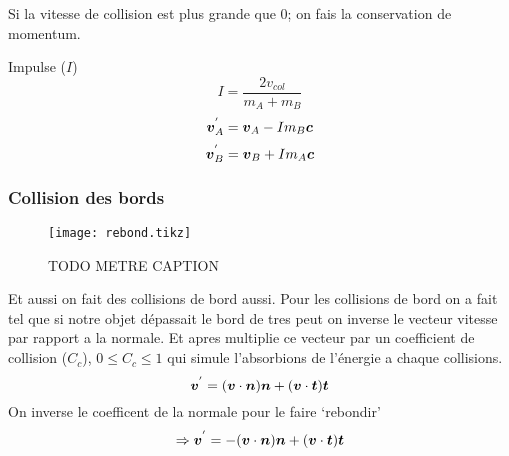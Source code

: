 \documentclass[a4paper, 11pt, oneside]{article} %
\begin{document}
            Si la vitesse de collision est plus grande que 0; on fais la conservation de momentum.
            
            Impulse ($I$)
            \begin{equation}
                I = \frac{2v_{col}}{m_A + m_B}
            \end{equation}
            \begin{equation}
                \vb*{v}_A^{'} = \vb*{v}_A - Im_B\vb*{c}
            \end{equation}
            \begin{equation}
                \vb*{v}_B^{'} = \vb*{v}_B + Im_A\vb*{c}
            \end{equation}
            

        \newpage
        \subsubsection{Collision des bords}
            \begin{wrapfigure}{r}{0.25\textwidth}
                \centering
                \texttt{[image: rebond.tikz]}
                \caption{TODO METRE CAPTION}
            \end{wrapfigure}
            Et aussi on fait des collisions de bord aussi.
            Pour les collisions de bord on a fait tel que si notre objet dépassait le bord de tres peut on inverse le vecteur vitesse par rapport a la normale. Et apres multiplie ce vecteur par un coefficient de collision ($C_c$), $0 \leq C_c \leq 1$ qui simule l'absorbions de l'énergie a chaque collisions. 
            \begin{equation}
                \vb*{v}^{'} = (\vb*{v}\cdot\vb*{n})\vb*{n} +(\vb*{v}\cdot\vb*{t})\vb*{t}
            \end{equation}
            On inverse le coefficent de la normale pour le faire `rebondir'
            \begin{equation}
                \Rightarrow\vb*{v}^{'} = -(\vb*{v}\cdot\vb*{n})\vb*{n} + (\vb*{v}\cdot\vb*{t})\vb*{t}
            \end{equation}
            
\end{document}
